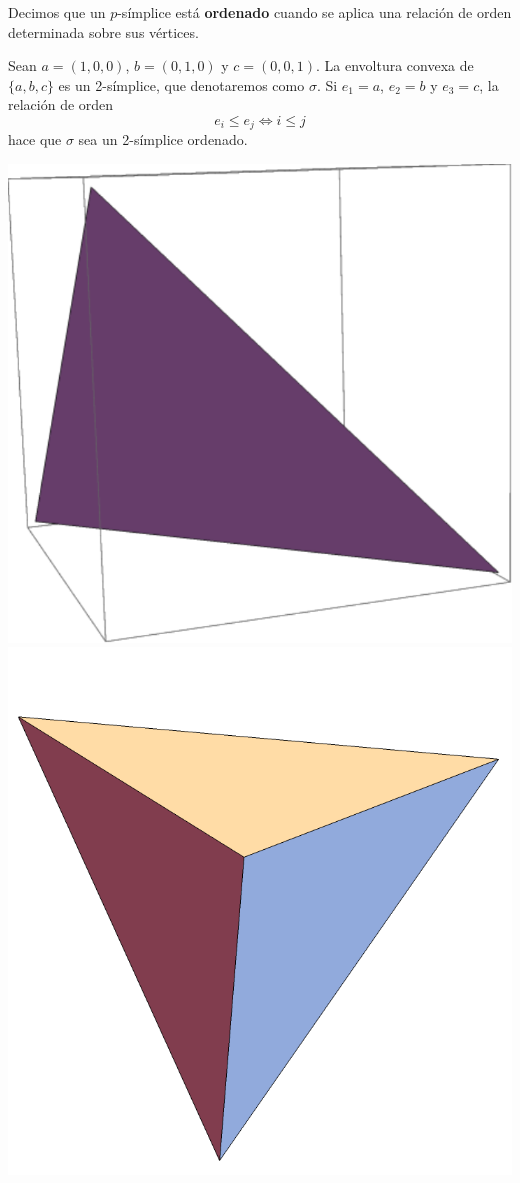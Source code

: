 Decimos que un $p$-símplice está \textbf{ordenado} cuando se aplica una relación
de orden determinada sobre sus vértices.

\begin{example}
Sean $a=(1,0,0)$, $b=(0,1,0)$ y $c=(0,0,1)$. La envoltura convexa de $\{a,b,c\}$
es un 2-símplice, que denotaremos como $\sigma$. Si $e_1=a$, $e_2=b$ y $e_3=c$,
la relación de orden
\[e_i \leq e_j \iff i \leq j\]
hace que $\sigma$ sea un 2-símplice ordenado.
\end{example}

\begin{marginfigure}
\centering
\includegraphics{Figures/2Simplice.pdf}
\includegraphics{Figures/Simplice.pdf}

\end{marginfigure}
